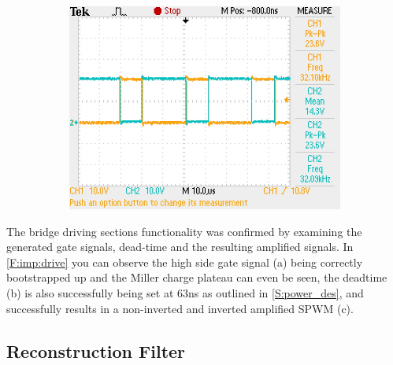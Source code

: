 \documentclass[11pt]{article}
\begin{document}
{\begin{figure}[h!]
  \begin{subfigure}{0.3\textwidth}
    \includegraphics[width=\columnwidth]{img/testing/power_output/fet_output.JPG}
  \end{subfigure}
  \caption{}
  \label{F:imp_drive}
\end{figure}

The bridge driving sections functionality was confirmed by examining the generated gate signals, dead-time and the resulting amplified signals. In \cref{F:imp:drive} you can observe the high side gate signal (a) being correctly bootstrapped up and the Miller charge plateau can even be seen, the deadtime (b) is also successfully being set at 63ns as outlined in  \cref{S:power_des}, and successfully results in a non-inverted and inverted amplified SPWM (c).

\subsection{Reconstruction Filter}
 
}
\end{document}
